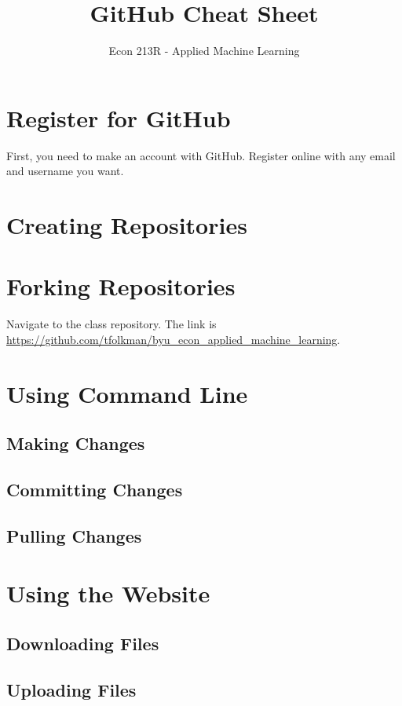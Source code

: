 \documentclass[11pt,a4paper]{article}
\title{GitHub Cheat Sheet}
\date{}
\author{Econ 213R - Applied Machine Learning}
\begin{document}
\vspace*{-75pt}
    {\let\newpage\relax\maketitle}
    
\section*{Register for GitHub}
First, you need to make an account with GitHub. 
Register online with any email and username you want.

\section*{Creating Repositories}

\section*{Forking Repositories}
Navigate to the class repository. 
The link is \url{https://github.com/tfolkman/byu_econ_applied_machine_learning}.

\section*{Using Command Line}
\subsection*{Making Changes}

\subsection*{Committing Changes}

\subsection*{Pulling Changes}

\section*{Using the Website}
\subsection*{Downloading Files}

\subsection*{Uploading Files}
\end{document}

